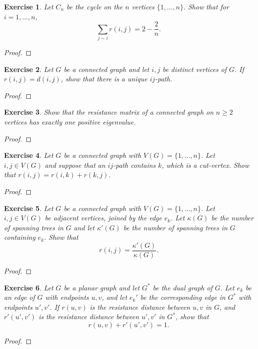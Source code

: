 \documentclass[11pt]{article}
\newtheorem{exercise}{Exercise}[section]
\theoremstyle{definition}
\begin{document}
\begin{exercise}
Let $C_n$ be the cycle on the $n$ vertices $\{1,\ldots,n\}$. Show that for $i=1,\ldots,n$,
\[
\sum_{j\sim i} r(i,j)=2-\frac{2}{n}.
\]
\end{exercise}
\begin{proof}
\end{proof}

\begin{exercise}
Let $G$ be a connected graph and let $i,j$ be distinct vertices of $G$. If $r(i,j)=d(i,j)$,
show that there is a unique $ij$-path.
\end{exercise}
\begin{proof}
\end{proof}

\begin{exercise}
Show that the resistance matrix of a connected graph on $n\ge 2$ vertices has exactly one
positive eigenvalue.
\end{exercise}
\begin{proof}
\end{proof}

\begin{exercise}
Let $G$ be a connected graph with $V(G)=\{1,\ldots,n\}$. Let $i,j\in V(G)$ and suppose that an
$ij$-path contains $k$, which is a cut-vertex. Show that $r(i,j)=r(i,k)+r(k,j)$.
\end{exercise}
\begin{proof}
\end{proof}

\begin{exercise}
Let $G$ be a connected graph with $V(G)=\{1,\ldots,n\}$. Let $i,j\in V(G)$ be adjacent vertices,
joined by the edge $e_k$. Let $\kappa(G)$ be the number of spanning trees in $G$ and let
$\kappa'(G)$ be the number of spanning trees in $G$ containing $e_k$. Show that
\[
r(i,j)=\frac{\kappa'(G)}{\kappa(G)}.
\]
\end{exercise}
\begin{proof}
\end{proof}

\begin{exercise}
Let $G$ be a planar graph and let $G^\ast$ be the dual graph of $G$. Let $e_k$ be an edge of $G$
with endpoints $u,v$, and let $e_k'$ be the corresponding edge in $G^\ast$ with endpoints
$u',v'$. If $r(u,v)$ is the resistance distance between $u,v$ in $G$, and $r'(u',v')$ is the
resistance distance between $u',v'$ in $G^\ast$, show that
\[
r(u,v)+r'(u',v')=1.
\]
\end{exercise}
\begin{proof}
\end{proof}
\end{document}
